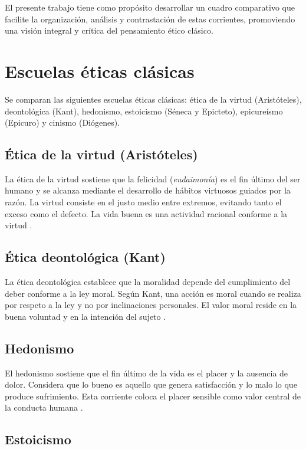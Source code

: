 \documentclass[
	spanish, %
	letterpaper, oneside
]{article}
\begin{document}
El presente trabajo tiene como propósito desarrollar un cuadro comparativo que facilite la organización, análisis y contrastación de estas corrientes, promoviendo una visión integral y crítica del pensamiento ético clásico.

\section{Escuelas éticas clásicas}

Se comparan las siguientes escuelas éticas clásicas: ética de la virtud (Aristóteles), deontológica (Kant), hedonismo, estoicismo (Séneca y Epicteto), epicureísmo (Epicuro) y cinismo (Diógenes).

\subsection*{Ética de la virtud (Aristóteles)}

La ética de la virtud sostiene que la felicidad (\textit{eudaimonía}) es el fin último del ser humano y se alcanza mediante el desarrollo de hábitos virtuosos guiados por la razón. La virtud consiste en el justo medio entre extremos, evitando tanto el exceso como el defecto. La vida buena es una actividad racional conforme a la virtud \citep{huerta2000etica}.

\subsection*{Ética deontológica (Kant)}

La ética deontológica establece que la moralidad depende del cumplimiento del deber conforme a la ley moral. Según Kant, una acción es moral cuando se realiza por respeto a la ley y no por inclinaciones personales. El valor moral reside en la buena voluntad y en la intención del sujeto \citep{huerta2000etica}.

\subsection*{Hedonismo}

El hedonismo sostiene que el fin último de la vida es el placer y la ausencia de dolor. Considera que lo bueno es aquello que genera satisfacción y lo malo lo que produce sufrimiento. Esta corriente coloca el placer sensible como valor central de la conducta humana \citep{huerta2000etica}.

\subsection*{Estoicismo}
\end{document}
